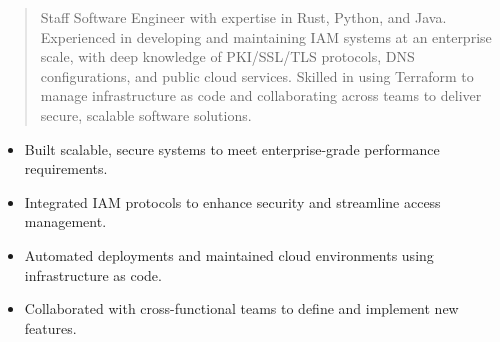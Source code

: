 



\makecvheader

\begin{quote}
  \noindent
  Staff Software Engineer with expertise in Rust, Python, and Java. Experienced in developing and maintaining IAM systems at an enterprise scale, with deep knowledge of PKI/SSL/TLS protocols, DNS configurations, and public cloud services. Skilled in using Terraform to manage infrastructure as code and collaborating across teams to deliver secure, scalable software solutions.
\end{quote}

\par\smallskip
\noindent
\begin{minipage}{20cm}
  \begin{minipage}{9.75cm}
    \begin{itemize}
      \item Built scalable, secure systems to meet enterprise-grade performance requirements.
      \item Integrated IAM protocols to enhance security and streamline access management.
    \end{itemize}
  \end{minipage}
  \hfill
  \begin{minipage}{9.75cm}
    \begin{itemize}
      \item Automated deployments and maintained cloud environments using infrastructure as code.
      \item Collaborated with cross-functional teams to define and implement new features.
    \end{itemize}
  \end{minipage}
\end{minipage}
\par\smallskip
\divider

